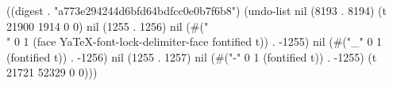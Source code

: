 
((digest . "a773e294244d6bfd64bdfcc0e0b7f6b8") (undo-list nil (8193 . 8194) (t 21900 1914 0 0) nil (1255 . 1256) nil (#("\\" 0 1 (face YaTeX-font-lock-delimiter-face fontified t)) . -1255) nil (#("_" 0 1 (fontified t)) . -1256) nil (1255 . 1257) nil (#("-" 0 1 (fontified t)) . -1255) (t 21721 52329 0 0)))
